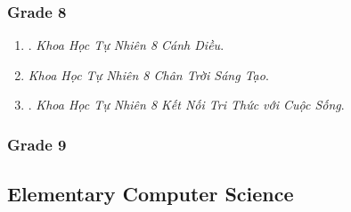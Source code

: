 \documentclass{article}
\begin{document}
\subsubsection{Grade 8}

\begin{enumerate}
	\item \cite{SGK_KHTN_8_Canh_Dieu}. \textit{Khoa Học Tự Nhiên 8 Cánh Diều}.\hfill{}
	\item \textit{Khoa Học Tự Nhiên 8 Chân Trời Sáng Tạo}.
	\item \cite{SGK_KHTN_8_KNTTVCS}. \textit{Khoa Học Tự Nhiên 8 Kết Nối Tri Thức với Cuộc Sống}.\hfill{}
\end{enumerate}

\subsubsection{Grade 9}

\subsection{Elementary Computer Science}
\end{document}
